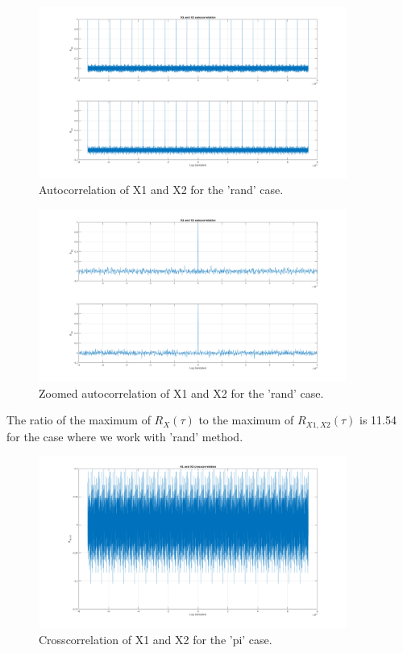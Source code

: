 \begin{figure}[H]
	\centering
	\includegraphics[width=0.9\textwidth]{figs/ex8_autocorr_rand.png}
	\caption{Autocorrelation of X1 and X2 for the 'rand' case.}
	\label{fig:ex8_autocorr_rand}
\end{figure}

\begin{figure}[H]
	\centering
	\includegraphics[width=0.9\textwidth]{figs/ex8_autocorr_zoomed_rand.png}
	\caption{Zoomed autocorrelation of X1 and X2 for the 'rand' case.}
	\label{fig:ex8_autocorr_zoomed_rand}
\end{figure}

The ratio of the maximum of $R_X(\tau)$ to the maximum of $R_{X1,X2}(\tau)$ is
11.54 for the case where we work with 'rand' method.

\begin{figure}[H]
	\centering
	\includegraphics[width=0.9\textwidth]{figs/ex8_crosscorr_pi.png}
	\caption{Crosscorrelation of X1 and X2 for the 'pi' case.}
	\label{fig:ex8_crosscorr_pi}
\end{figure}

